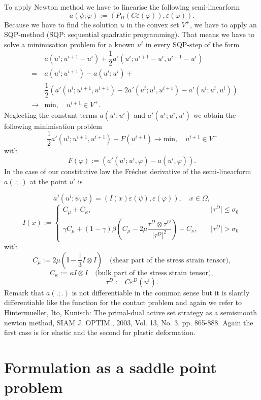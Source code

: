\documentclass{article}
\begin{document}
To apply Newton method we have to linearise the following semi-linearform
$$a(\psi;\varphi) := \left(P_{\Pi}(C\varepsilon(\varphi)),\varepsilon(\varphi)\right).$$
Because we have to find the solution $u$ in the convex set $V^+$, we have to
apply an SQP-method (SQP: sequential quadratic programming). That means we have
to solve a minimisation problem for a known $u^i$ in every SQP-step of the form
\begin{eqnarray*}
 & & a(u^{i};u^{i+1} - u^i) + \dfrac{1}{2}a'(u^i;u^{i+1} - u^i,u^{i+1} - u^i)\\
 &=&  a(u^i;u^{i+1}) -  a(u^i;u^i) +\\
 & & \dfrac{1}{2}\left( a'(u^i;u^{i+1},u^{i+1}) - 2a'(u^i;u^i,u^{i+1}) - a'(u^i;u^i,u^i)\right)\\
 &\rightarrow& \textrm{min},\quad u^{i+1}\in V^+.
\end{eqnarray*}
Neglecting the constant terms $ a(u^i;u^i)$ and $ a'(u^i;u^i,u^i)$ we obtain the
following minimisation problem $$\dfrac{1}{2} a'(u^i;u^{i+1},u^{i+1}) -
F(u^{i+1})\rightarrow \textrm{min},\quad u^{i+1}\in V^+$$ with $$F(\varphi) :=
\left(a'(u^{i};u^{i},\varphi) -  a(u^{i},\varphi) \right).$$
In the case of our constitutive law the Fr\'echet derivative of the
semi-linearform $a(.;.)$ at the point $u^i$ is

$$a'(u^i;\psi,\varphi) =
(I(x)\varepsilon(\psi),\varepsilon(\varphi)),\quad x\in\Omega,$$ $$
I(x) := \begin{cases}
C_{\mu} + C_{\kappa}, &
\quad \vert \tau^D \vert \leq \sigma_0\\
\gamma C_{\mu} + (1-\gamma)\beta\left(C_{\mu} -
2\mu\dfrac{\tau^D\otimes\tau^D}{\vert\tau^D\vert^2}\right) + C_{\kappa}, &\quad
\vert \tau^D \vert > \sigma_0
\end{cases}
$$
with
$$C_{\mu} := 2\mu\left(\mathbb{I}  - \dfrac{1}{3} I\otimes
I\right)\quad\text{(shear part of the stress strain tensor)},$$
$$C_{\kappa} := \kappa I\otimes I\quad\text{(bulk part of the stress strain
tensor)},$$
$$\tau^D := C\varepsilon^D(u^i).$$
Remark that $a(.;.)$ is not differentiable in the common sense but it is
slantly differentiable like the function for the contact problem and again we refer to
Hintermueller, Ito, Kunisch: The primal-dual active set strategy as a semismooth newton method, SIAM J. OPTIM., 2003, Vol. 13, No. 3, pp. 865-888.
Again the first case is for elastic and the second for plastic deformation.

\section{Formulation as a saddle point problem}
\end{document}
